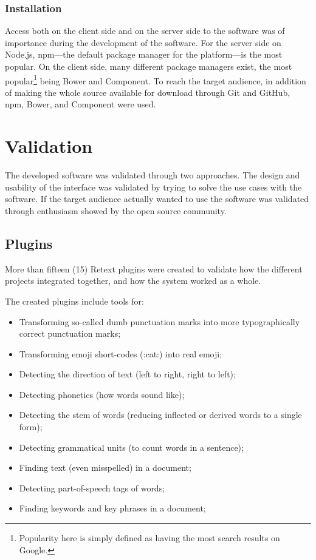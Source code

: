 \subsection{Installation}\label{installation}

Access both on the client side and on the server side to the software
was of importance during the development of the software. For the server
side on Node.js, \gls{npm}---the default package manager for the platform---is
the most popular. On the client side, many different package managers
exist, the most popular\footnote{Popularity here is simply defined as
  having the most search results on Google.} being Bower and Component.
To reach the target audience, in addition of making the whole source
available for download through Git and GitHub, \gls{npm}, Bower, and Component
were used.

\chapter{Validation}\label{validation}

The developed software was validated through two approaches. The design
and usability of the interface was validated by trying to solve the use
cases with the software. If the target audience actually wanted to use
the software was validated through enthusiasm showed by the open source
community.

\section{Plugins}\label{plugins}

More than fifteen (15) Retext plugins were created to validate how the
different projects integrated together, and how the system worked as a
whole.

The created plugins include tools for:

\begin{itemize}
\itemsep1pt\parskip0pt
\item
  Transforming so-called dumb punctuation marks into more
  typographically correct punctuation marks;
\item
  Transforming emoji short-codes (:cat:) into real emoji;
\item
  Detecting the direction of text (left to right, right to left);
\item
  Detecting phonetics (how words sound like);
\item
  Detecting the stem of words (reducing inflected or derived words to a
  single form);
\item
  Detecting grammatical units (to count words in a sentence);
\item
  Finding text (even misspelled) in a document;
\item
  Detecting part-of-speech tags of words;
\item
  Finding keywords and key phrases in a document;
\end{itemize}

